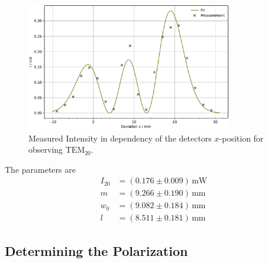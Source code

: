 \begin{figure}
	\centering
	\includegraphics[width=0.8\textwidth]{content/plots/TEM02.pdf}
	\caption{Measured Intensity in dependency of the detectors $x$-position for observing $\text{TEM}_{20}$.}
	\label{fig:TEM02}
\end{figure}
The parameters are
\begin{align*}
    I_{20} &= \left( 0.176\pm0.009 \right) \, \text{mW} \\
    m &= \left( 9.266\pm0.190 \right) \, \text{mm} \\
    w_0 &= \left( 9.082\pm0.184 \right) \, \text{mm} \\
    l &= \left( 8.511\pm0.181 \right) \, \text{mm}
\end{align*}

\subsection{Determining the Polarization}

